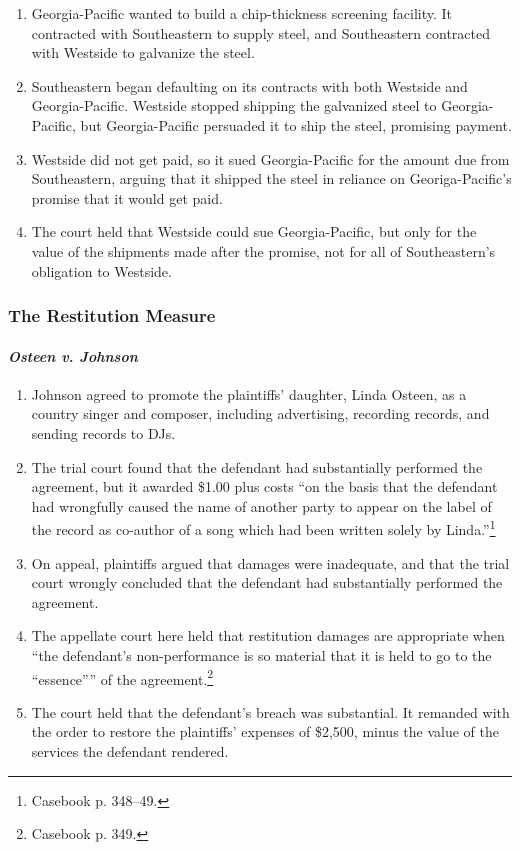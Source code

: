\begin{enumerate}
    \item Georgia-Pacific wanted to build a chip-thickness screening facility. 
    It contracted with Southeastern to supply steel, and Southeastern 
    contracted with Westside to galvanize the steel.
    \item Southeastern began defaulting on its contracts with both Westside 
    and Georgia-Pacific. Westside stopped shipping the galvanized steel to 
    Georgia-Pacific, but Georgia-Pacific persuaded it to ship the steel, 
    promising payment.
    \item Westside did not get paid, so it sued Georgia-Pacific for the amount 
    due from Southeastern, arguing that it shipped the steel in reliance on 
    Georiga-Pacific's promise that it would get paid.
    \item The court held that Westside could sue Georgia-Pacific, but only for 
    the value of the shipments made after the promise, not for all of 
    Southeastern's obligation to Westside.
\end{enumerate}

\subsubsection{The Restitution Measure}

\paragraph{\emph{Osteen v. Johnson}}

\begin{enumerate}
    \item Johnson agreed to promote the plaintiffs' daughter, Linda Osteen, as 
    a country singer and composer, including advertising, recording records, 
    and sending records to DJs.
    \item The trial court found that the defendant had substantially performed 
    the agreement, but it awarded \$1.00 plus costs ``on the basis that the 
    defendant had wrongfully caused the name of another party to appear on the 
    label of the record as co-author of a song which had been written solely 
    by Linda.''\footnote{Casebook p. 348--49.}
    \item On appeal, plaintiffs argued that damages were inadequate, and that 
    the trial court wrongly concluded that the defendant had substantially 
    performed the agreement.
    \item The appellate court here held that restitution damages are 
    appropriate when ``the defendant's non-performance is so material that it 
    is held to go to the \enquote{essence}'' of the 
    agreement.\footnote{Casebook p. 349.}
    \item The court held that the defendant's breach was substantial. It 
    remanded with the order to restore the plaintiffs' expenses of \$2,500, 
    minus the value of the services the defendant rendered.
\end{enumerate}

